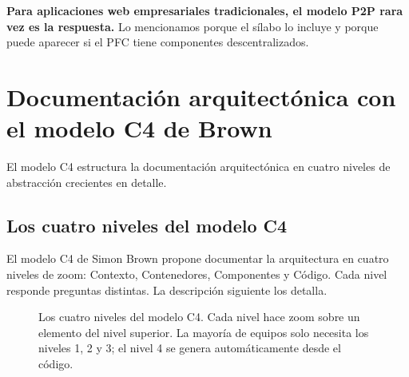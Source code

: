 \documentclass[11pt,a4paper,openany]{book}
\begin{document}
\textbf{Para aplicaciones web empresariales tradicionales, el modelo
P2P rara vez es la respuesta.} Lo mencionamos porque el sílabo lo
incluye y porque puede aparecer si el PFC tiene componentes
descentralizados.

\section{Documentación arquitectónica con el modelo C4 de Brown}

El modelo C4 \cite{brown2023c4} estructura la documentación
arquitectónica en cuatro niveles de abstracción crecientes en detalle.

\subsection{Los cuatro niveles del modelo C4}

El modelo C4 de Simon Brown propone documentar la
arquitectura en cuatro niveles de zoom: Contexto, Contenedores,
Componentes y Código. Cada nivel responde preguntas distintas. La
descripción siguiente los detalla.


\begin{figure}[htbp]
\centering
{}
\caption{Los cuatro niveles del modelo C4. Cada nivel hace zoom sobre
un elemento del nivel superior. La mayoría de equipos solo necesita
los niveles 1, 2 y 3; el nivel 4 se genera automáticamente desde el
código.}
\end{figure}
\end{document}
